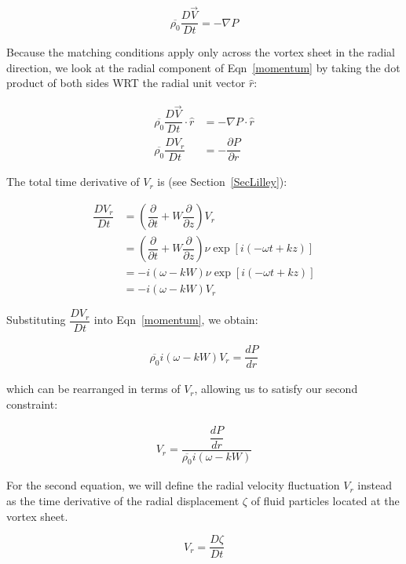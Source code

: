 \documentclass[]{aiaa-tc}%
\begin{document}
\begin{equation} \label{momentum}
\overline{\rho_0} \dfrac{D\vec{V} }{Dt} = - \nabla P
\end{equation}

Because the matching conditions apply only across the vortex sheet in the radial direction, we look at the radial component of Eqn~\ref{momentum} by taking the dot product of both sides WRT the radial unit vector $\hat{r}$:

\begin{align*}
\overline{\rho_0} \dfrac{D\vec{V}}{Dt} \cdot \hat{r}
    &= - \nabla P \cdot \hat{r} \\
\overline{\rho_0} \dfrac{D V_r}{Dt} &= - \dfrac{\partial P}{\partial r}
\end{align*}

The total time derivative of $V_r$ is (see Section~\ref{SecLilley}):

\begin{align*}
\dfrac{D V_r}{Dt}
  &= \left(\dfrac{\partial}{\partial t} + W \dfrac{\partial}{\partial z}\right)
  V_r \\
  &= \left(\dfrac{\partial}{\partial t} + W \dfrac{\partial}{\partial z}\right)
  \nu \exp[i(-\omega t + kz)] \\
  &= - i( \omega - kW ) \nu\exp[i(-\omega t + kz)] \\
  &= - i( \omega - kW ) V_r
\end{align*}

Substituting $\dfrac{D V_r}{Dt}$ into Eqn~\ref{momentum}, we obtain:

\begin{align}
\overline{\rho_0} i( \omega - kW ) V_r = \dfrac{d P}{d r}
\end{align}

\noindent which can be rearranged in terms of $V_r$, allowing us to satisfy our second constraint:

\begin{align}
\boxed{V_r = \dfrac{\dfrac{d P}{d r}}{\overline{\rho_0} i( \omega - kW )}}
\end{align}







For the second equation, we will define the radial velocity fluctuation $V_r$ instead as the time derivative of the radial displacement $\zeta$ of fluid particles located at the vortex sheet.

\begin{equation}
V_r = \dfrac{D\zeta}{Dt}
\end{equation}
\end{document}
